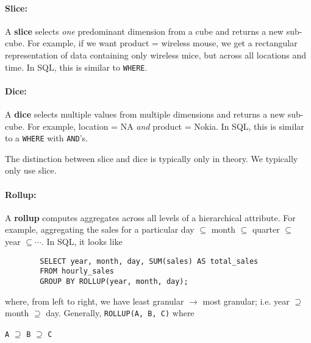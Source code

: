 \documentclass{report}
\newenvironment{aside}{\begin{tcolorbox}[title={Aside},colback=blue!5!white,colframe=black!75!blue]}{\end{tcolorbox}}
\renewcommand{\bf}[1]{\textbf{{#1}}}
\renewcommand{\tt}[1]{\texttt{{#1}}}
\renewcommand{\it}[1]{\textit{{#1}}}
\begin{document}
\paragraph{Slice:} A \bf{slice} selects \it{one} predominant dimension from a
cube and returns a new sub-cube. For example, if we want product = wireless
mouse, we get a rectangular representation of data containing only wireless
mice, but across all locations and time. In SQL, this is similar to \tt{WHERE}.

\paragraph{Dice:} A \bf{dice} selects multiple values from multiple dimensions
and returns a new sub-cube. For example, location = NA \it{and} product =
Nokia. In SQL, this is similar to a \tt{WHERE} with \tt{AND}'s.
\begin{aside}
    The distinction between slice and dice is typically only in theory. We
    typically only use slice.
\end{aside}

\paragraph{Rollup:} A \bf{rollup} computes aggregates across all levels of
a hierarchical attribute. For example, aggregating the sales for a particular
day $\subseteq$ month $\subseteq$ quarter $\subseteq$ year $\subseteq \cdots$.
In SQL, it looks like
\begin{center}
    \begin{BVerbatim}
        SELECT year, month, day, SUM(sales) AS total_sales
        FROM hourly_sales
        GROUP BY ROLLUP(year, month, day);
    \end{BVerbatim}
\end{center}
where, from left to right, we have least granular $\to$ most granular; i.e.
year $\supseteq$ month $\supseteq$ day. Generally, \tt{ROLLUP(A, B, C)} where
\begin{center}
    \tt{A} $\supseteq$ \tt{B} $\supseteq$ \tt{C}
\end{center}
\end{document}
